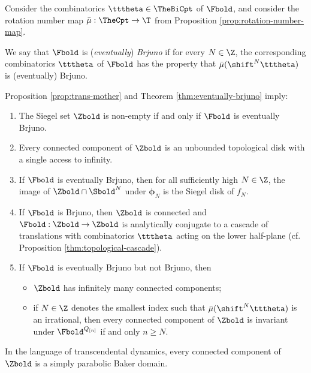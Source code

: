 \documentclass{amsart}
\begin{document}
Consider the combinatorics $\tttheta \in \TheBiCpt$ of $\Fbold$, and consider the rotation number map $\bar{\mu} : \TheCpt \to \T$ from Proposition \ref{prop:rotation-number-map}.

\begin{definition}
\label{defn:brjuno}
    We say that $\Fbold$ is (\emph{eventually}) \emph{Brjuno} if for every $N \in \Z$, the corresponding combinatorics $\tttheta$ of $\Fbold$ has the property that $\bar{\mu}(\shift^N\tttheta)$ is (eventually) Brjuno.
\end{definition}

Proposition \ref{prop:trans-mother} and Theorem \ref{thm:eventually-brjuno} imply:

\begin{proposition}
\label{prop:eventually-brjuno}
\leavevmode
    \begin{enumerate}
        \item The Siegel set $\Zbold$ is non-empty if and only if $\Fbold$ is eventually Brjuno.
        \item Every connected component of $\Zbold$ is an unbounded topological disk with a single access to infinity.
        \item If $\Fbold$ is eventually Brjuno, then for all sufficiently high $N \in \Z$, the image of $\Zbold \cap \Sbold^N$ under $\boldsymbol{\phi}_N$ is the Siegel disk of $f_N$.
        \item If $\Fbold$ is Brjuno, then $\Zbold$ is connected and $\Fbold: \Zbold \to \Zbold$ is analytically conjugate to a cascade of translations with combinatorics $\tttheta$ acting on the lower half-plane (cf. Proposition \ref{thm:topological-cascade}).
        \item If $\Fbold$ is eventually Brjuno but not Brjuno, then
        \begin{itemize}
            \item $\Zbold$ has infinitely many connected components;
            \item if $N \in \Z$ denotes the smallest index such that $\bar{\mu}(\shift^N\tttheta)$ is an irrational, then every connected component of $\Zbold$ is invariant under $\Fbold^{Q_{[n]}}$ if and only $n \geq N$.
        \end{itemize}
    \end{enumerate}
\end{proposition}

In the language of transcendental dynamics, every connected component of $\Zbold$ is a simply parabolic Baker domain.
\end{document}

